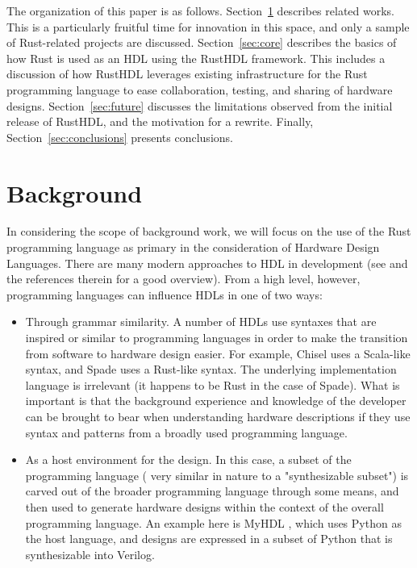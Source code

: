 \documentclass[conference]{IEEEtran}
\begin{document}
The organization of this paper is as follows.  Section~\ref{sec:related} describes related
works.  This is a particularly fruitful time for innovation in this space, and only a
sample of Rust-related projects are discussed. Section~\ref{sec:core} describes the 
basics of how Rust is used as an HDL using the RustHDL
framework.  This includes a discussion of how RustHDL leverages existing infrastructure 
for the Rust programming language to ease collaboration, testing, and sharing of hardware 
designs.  Section~\ref{sec:future} discusses the limitations observed from the initial
release of RustHDL, and the motivation for a rewrite.  Finally, Section~\ref{sec:conclusions}
presents conclusions.

\section{Background}\label{sec:related}

In considering the scope of background work, we will focus on the use of the Rust programming
language as primary in the consideration of Hardware Design Languages.  There are many modern
approaches to HDL in development (see \cite{b1} and the references therein for a good overview).  
From a high level, however, programming languages can influence HDLs in one of two ways:

\begin{itemize}
  \item Through grammar similarity.  A number of HDLs use syntaxes that are inspired or similar to
  programming languages in order to make the transition from software to hardware design easier.
  For example, Chisel \cite{b2} uses a Scala-like syntax, and Spade \cite{b1} uses a Rust-like syntax.
  The underlying implementation language is irrelevant (it happens to be Rust in the case of Spade).
  What is important is that the background experience and knowledge of the developer can be brought 
  to bear when understanding hardware descriptions if they use syntax and patterns from a broadly
  used programming language.
  \item As a host environment for the design.  In this case, a subset of the programming language (
    very similar in nature to a "synthesizable subset") is carved out of the broader programming language
    through some means, and then used to generate hardware designs within the context of the overall
    programming language.  An example here is MyHDL \cite{b3}, which uses Python as the host language, and 
    designs are expressed in a subset of Python that is synthesizable into Verilog.
\end{itemize}
\end{document}
